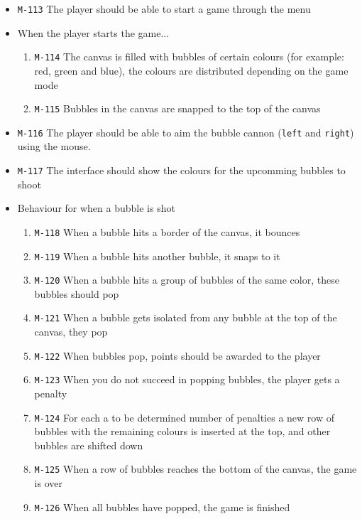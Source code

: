 \documentclass[a4paper]{article}
\begin{document}
\begin{itemize}
  \item \texttt{M-113} The player should be able to start a game through the menu

  \item When the player starts the game...
  \begin{enumerate}
    \item \texttt{M-114} The canvas is filled with bubbles of certain colours (for example: red, green and blue), the colours are distributed depending on the game mode
    \item \texttt{M-115} Bubbles in the canvas are snapped to the top of the canvas
  \end{enumerate}
  
  \item \texttt{M-116} The player should be able to aim the bubble cannon (\texttt{left} and \texttt{right}) using the mouse.
  \item \texttt{M-117} The interface should show the colours for the upcomming bubbles to shoot


  \item Behaviour for when a bubble is shot
  \begin{enumerate}
    \item \texttt{M-118} When a bubble hits a border of the canvas, it bounces
    \item \texttt{M-119} When a bubble hits another bubble, it snaps to it
    \item \texttt{M-120} When a bubble hits a group of bubbles of the same color, these bubbles should pop
    \item \texttt{M-121} When a bubble gets isolated from any bubble at the top of the canvas, they pop
    \item \texttt{M-122} When bubbles pop, points should be awarded to the player
    \item \texttt{M-123} When you do not succeed in popping bubbles, the player gets a penalty
    \item \texttt{M-124} For each a to be determined number of penalties a new row of bubbles with the remaining colours is inserted at the top, and other bubbles are shifted down
    \item \texttt{M-125} When a row of bubbles reaches the bottom of the canvas, the game is over
    \item \texttt{M-126} When all bubbles have popped, the game is finished
  \end{enumerate}
  

\end{itemize}
\end{document}
